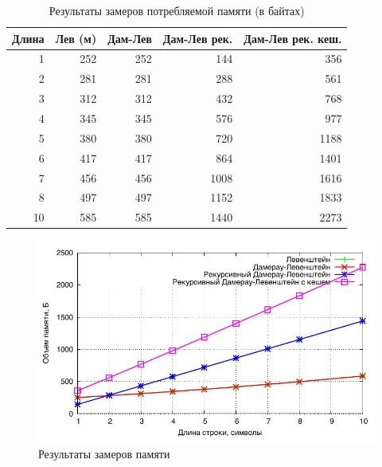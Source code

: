 \begin{table}[h]
  \caption{\label{table:memory} Результаты замеров потребляемой памяти (в байтах)}
  \begin{center}
    \begin{tabular}{|r|r|r|r|r|}
      \hline
      Длина & Лев (м) & Дам-Лев & Дам-Лев рек. & Дам-Лев рек. кеш. \\ \hline
      1 & 252 & 252 & 144 & 356 \\ \hline
      2 & 281 & 281 & 288 & 561 \\ \hline
      3 & 312 & 312 & 432 & 768 \\ \hline
      4 & 345 & 345 & 576 & 977 \\ \hline
      5 & 380 & 380 & 720 & 1188 \\ \hline
      6 & 417 & 417 & 864 & 1401 \\ \hline
      7 & 456 & 456 & 1008 & 1616 \\ \hline
      8 & 497 & 497 & 1152 & 1833 \\ \hline
      10 & 585 & 585 & 1440 & 2273 \\ \hline
    \end{tabular}
  \end{center}
\end{table}

\newpage


\noindent
\begin{figure}[t!]
	\centering
    \includegraphics[width=0.75\linewidth]{../data/memory.pdf}
    \caption{Результаты замеров памяти}
    \label{img:memory}
\end{figure}

\newpage